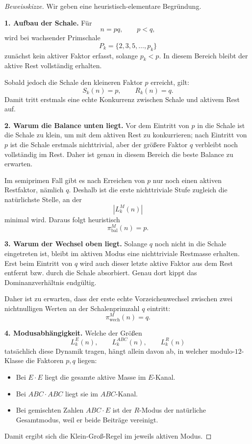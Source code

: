 \documentclass[11pt,a4paper]{article}
\theoremstyle{definition}
\theoremstyle{remark}
\begin{document}
	\begin{proof}[Beweisskizze]
		Wir geben eine heuristisch-elementare Begründung.
		
		\medskip
		\noindent
		\textbf{1. Aufbau der Schale.}
		Für
		\[
		n=pq,\qquad p<q,
		\]
		wird bei wachsender Primschale
		\[
		P_k=\{2,3,5,\dots,p_k\}
		\]
		zunächst kein aktiver Faktor erfasst, solange \(p_k<p\). In diesem Bereich bleibt der
		aktive Rest vollständig erhalten.
		
		Sobald jedoch die Schale den kleineren Faktor \(p\) erreicht, gilt:
		\[
		S_k(n)=p,\qquad R_k(n)=q.
		\]
		Damit tritt erstmals eine echte Konkurrenz zwischen Schale und aktivem Rest auf.
		
		\medskip
		\noindent
		\textbf{2. Warum die Balance unten liegt.}
		Vor dem Eintritt von \(p\) in die Schale ist die Schale zu klein, um mit dem aktiven Rest
		zu konkurrieren; nach Eintritt von \(p\) ist die Schale erstmals nichttrivial, aber der
		größere Faktor \(q\) verbleibt noch vollständig im Rest. Daher ist genau in diesem Bereich
		die beste Balance zu erwarten.
		
		Im semiprimen Fall gibt es nach Erreichen von \(p\) nur noch einen aktiven Restfaktor,
		nämlich \(q\). Deshalb ist die erste nichttriviale Stufe zugleich die natürlichste Stelle,
		an der
		\[
		|L_k^M(n)|
		\]
		minimal wird. Daraus folgt heuristisch
		\[
		\pi_{\mathrm{bal}}^{M}(n)=p.
		\]
		
		\medskip
		\noindent
		\textbf{3. Warum der Wechsel oben liegt.}
		Solange \(q\) noch nicht in die Schale eingetreten ist, bleibt im aktiven Modus eine
		nichttriviale Restmasse erhalten. Erst beim Eintritt von \(q\) wird auch dieser letzte
		aktive Faktor aus dem Rest entfernt bzw. durch die Schale absorbiert. Genau dort kippt das
		Dominanzverhältnis endgültig.
		
		Daher ist zu erwarten, dass der erste echte Vorzeichenwechsel zwischen zwei nichtnulligen
		Werten an der Schalenprimzahl \(q\) eintritt:
		\[
		\pi_{\mathrm{wech}}^{M}(n)=q.
		\]
		
		\medskip
		\noindent
		\textbf{4. Modusabhängigkeit.}
		Welche der Größen
		\[
		L_k^E(n),\qquad L_k^{ABC}(n),\qquad L_k^R(n)
		\]
		tatsächlich diese Dynamik tragen, hängt allein davon ab, in welcher modulo-\(12\)-Klasse
		die Faktoren \(p,q\) liegen:
		
		\begin{itemize}
			\item Bei \(E\cdot E\) liegt die gesamte aktive Masse im \(E\)-Kanal.
			\item Bei \(ABC\cdot ABC\) liegt sie im \(ABC\)-Kanal.
			\item Bei gemischten Zahlen \(ABC\cdot E\) ist der \(R\)-Modus der natürliche Gesamtmodus,
			weil er beide Beiträge vereinigt.
		\end{itemize}
		
		Damit ergibt sich die Klein-Groß-Regel im jeweils aktiven Modus.
	\end{proof}
	
\end{document}
